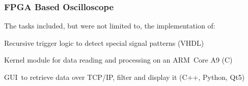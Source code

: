 \begin{timeline}
    \subsubsection{FPGA Based Oscilloscope}
    The tasks included, but were not limited to, the implementation of:
    \begin{tightemize}
    \item Recursive trigger logic to detect special signal patterns (VHDL)
    \item Kernel module for data reading and processing on an ARM Core A9 (C)
    \item GUI to retrieve data over TCP/IP, filter and display it (C++, Python, Qt5)
    \end{tightemize}
    \sectionsep

    \end{timeline}%